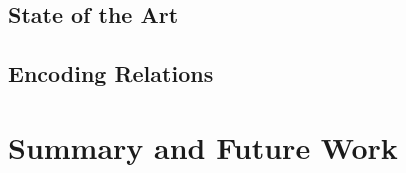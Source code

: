 \documentclass{report}
\begin{document}
  \section{State of the Art}
  \label{sec:relalg_sota}
  

  \section{Encoding Relations}
  \label{chap:relationalalgebra}
  
  
%

\chapter{Summary and Future Work}
\label{chap:futurework}




\end{document}

